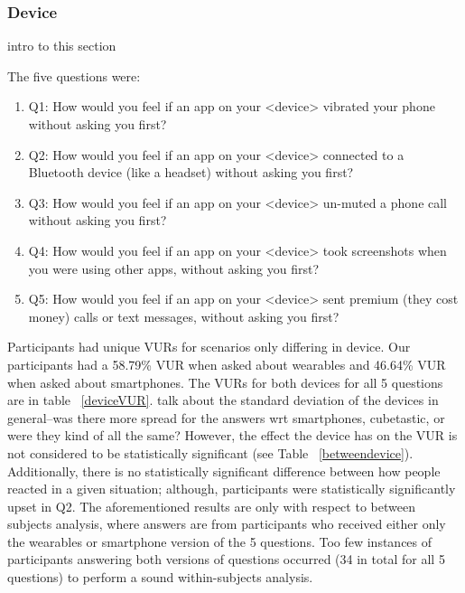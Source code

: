 
\subsubsection{Device}
{\color {red} intro to this section} 

The five questions were:
\begin{enumerate}[topsep=0pt,itemsep=-1ex,partopsep=1ex,parsep=1ex]
\item Q1: How would you feel if an app on your <device> vibrated your phone without asking you first?
\item Q2: How would you feel if an app on your <device> connected to a Bluetooth device (like a headset) without asking you first?
\item Q3: How would you feel if an app on your <device> un-muted a phone call without asking you first?
\item Q4: How would you feel if an app on your <device> took screenshots when you were using other apps, without asking you first?
\item Q5: How would you feel if an app on your <device> sent premium (they cost money) calls or text messages, without asking you first?
\end{enumerate}

Participants had unique VURs for scenarios only differing in device. Our participants had a 58.79\% VUR when asked about wearables and 46.64\% VUR when asked about smartphones. The VURs for both devices for all 5 questions are in table ~\ref{deviceVUR}. {\color {red} talk about the standard deviation of the devices in general--was there more spread for the answers wrt smartphones, cubetastic, or were they kind of all the same?} However, the effect the device has on the VUR is not considered to be statistically significant (see Table ~\ref{betweendevice}). Additionally, there is no statistically significant difference between how people reacted in a given situation; although, participants were statistically significantly upset in Q2. The aforementioned results are only with respect to between subjects analysis, where answers are from participants who received either only the wearables or smartphone version of the 5 questions. Too few instances of participants answering both versions of questions occurred (34 in total for all 5 questions) to perform a sound within-subjects analysis.  

